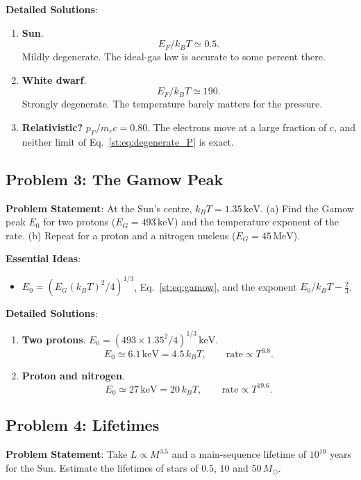 \textbf{Detailed Solutions}:
\begin{enumerate}[label=(\alph*)]
	\item \textbf{Sun}.
	\[
	\boxed{E_F/k_BT\simeq0.5.}
	\]
	Mildly degenerate. The ideal-gas law is accurate to some percent there.
	\item \textbf{White dwarf}.
	\[
	\boxed{E_F/k_BT\simeq190.}
	\]
	Strongly degenerate. The temperature barely matters for the pressure.
	\item \textbf{Relativistic?} $p_F/m_ec=0.80$. The electrons move at a large fraction of $c$, and neither limit of Eq.~\eqref{st:eq:degenerate_P} is exact.
\end{enumerate}

\subsection{Problem 3: The Gamow Peak}
\label{st:prob:gamow}

\textbf{Problem Statement}: At the Sun's centre, $k_BT=1.35\,\mathrm{keV}$. (a) Find the Gamow peak $E_0$ for two protons ($E_G=493\,\mathrm{keV}$) and the temperature exponent of the rate. (b) Repeat for a proton and a nitrogen nucleus ($E_G=45\,\mathrm{MeV}$).

\textbf{Essential Ideas}:
\begin{itemize}
	\item $E_0=(E_G(k_BT)^2/4)^{1/3}$, Eq.~\eqref{st:eq:gamow}, and the exponent $E_0/k_BT-\tfrac23$.
\end{itemize}

\textbf{Detailed Solutions}:
\begin{enumerate}[label=(\alph*)]
	\item \textbf{Two protons}. $E_0=(493\times1.35^2/4)^{1/3}\,\mathrm{keV}$.
	\[
	\boxed{E_0\simeq6.1\,\mathrm{keV}=4.5\,k_BT,\qquad\text{rate}\propto T^{3.8}.}
	\]
	\item \textbf{Proton and nitrogen}.
	\[
	\boxed{E_0\simeq27\,\mathrm{keV}=20\,k_BT,\qquad\text{rate}\propto T^{19.6}.}
	\]
\end{enumerate}

\subsection{Problem 4: Lifetimes}
\label{st:prob:lifetimes}

\textbf{Problem Statement}: Take $L\propto M^{3.5}$ and a main-sequence lifetime of $10^{10}$ years for the Sun. Estimate the lifetimes of stars of $0.5$, $10$ and $50\,M_\odot$.

